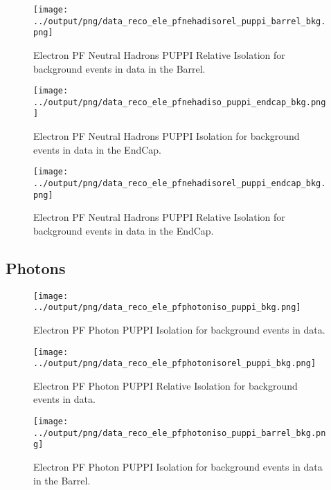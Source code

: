 \documentclass[11pt]{book}
\begin{document}
\begin{figure}[htb]
\centering
\texttt{[image: ../output/png/data\_reco\_ele\_pfnehadisorel\_puppi\_barrel\_bkg.png]}
\caption{Electron PF Neutral Hadrons PUPPI Relative Isolation for background events in data in the Barrel.}
\label{fig:data_ele_pfnehadisorel_puppi_barrel_bkg}
\end{figure}

\begin{figure}[htb]
\centering
\texttt{[image: ../output/png/data\_reco\_ele\_pfnehadiso\_puppi\_endcap\_bkg.png]}
\caption{Electron PF Neutral Hadrons PUPPI Isolation for background events in data in the EndCap.}
\label{fig:data_ele_pfnehadiso_puppi_endcap_bkg}
\end{figure}

\begin{figure}[htb]
\centering
\texttt{[image: ../output/png/data\_reco\_ele\_pfnehadisorel\_puppi\_endcap\_bkg.png]}
\caption{Electron PF Neutral Hadrons PUPPI Relative Isolation for background events in data in the EndCap.}
\label{fig:data_ele_pfnehadisorel_puppi_endcap_bkg}
\end{figure}
\clearpage

\subsection{Photons}
\begin{figure}[htb]
\centering
\texttt{[image: ../output/png/data\_reco\_ele\_pfphotoniso\_puppi\_bkg.png]}
\caption{Electron PF Photon PUPPI Isolation for background events in data.}
\label{fig:data_ele_pfphotoniso_puppi_bkg}
\end{figure}

\begin{figure}[htb]
\centering
\texttt{[image: ../output/png/data\_reco\_ele\_pfphotonisorel\_puppi\_bkg.png]}
\caption{Electron PF Photon PUPPI Relative Isolation for background events in data.}
\label{fig:data_ele_pfphotonisorel_puppi_bkg}
\end{figure}

\begin{figure}[htb]
\centering
\texttt{[image: ../output/png/data\_reco\_ele\_pfphotoniso\_puppi\_barrel\_bkg.png]}
\caption{Electron PF Photon PUPPI Isolation for background events in data in the Barrel.}
\label{fig:data_ele_pfphotoniso_puppi_barrel_bkg}
\end{figure}
\end{document}
